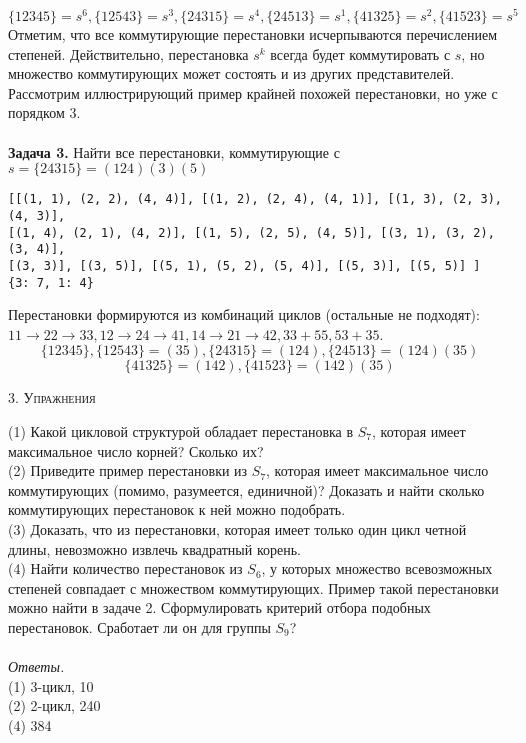 \documentclass[a4paper,12pt]{article}
\begin{document}
\[\{12345\} = s^6, \{12543\} = s^3, \{24315\} = s^4, \{24513\} = s^1, \{41325\} = s^2, \{41523\} = s^5\]
Отметим, что все коммутирующие перестановки исчерпываются перечислением степеней. Действительно, перестановка $s^k$ всегда будет коммутировать с $s$, но множество коммутирующих может состоять и из других представителей. Рассмотрим иллюстрирующий пример крайней похожей перестановки, но уже с порядком 3. \\
\\
\textbf{Задача 3.} Найти все перестановки, коммутирующие с $s = \{24315\} = (124)(3)(5)$
\begin{lstlisting}
[[(1, 1), (2, 2), (4, 4)], [(1, 2), (2, 4), (4, 1)], [(1, 3), (2, 3), (4, 3)],
[(1, 4), (2, 1), (4, 2)], [(1, 5), (2, 5), (4, 5)], [(3, 1), (3, 2), (3, 4)], 
[(3, 3)], [(3, 5)], [(5, 1), (5, 2), (5, 4)], [(5, 3)], [(5, 5)] ]
{3: 7, 1: 4}
\end{lstlisting}
Перестановки формируются из комбинаций циклов (остальные не подходят): $11 \rightarrow 22 \rightarrow 33, 12 \rightarrow 24 \rightarrow 41, 14 \rightarrow 21 \rightarrow 42, 33 + 55, 53 + 35$.
\[\{12345\}, \{12543\} = (35), \{24315\} = (124), \{24513\} = (124)(35) \]
\[\{41325\} = (142), \{41523\} = (142)(35) \]
\begin{center}
    \textsc{3. Упражнения}
\end{center}
(1) Какой цикловой структурой обладает перестановка в $S_7$, которая имеет максимальное число корней? Сколько их? \\ 
(2) Приведите пример перестановки из $S_7$, которая имеет максимальное число коммутирующих (помимо, разумеется, единичной)? Доказать и найти сколько коммутирующих перестановок к ней можно подобрать. \\
(3) Доказать, что из перестановки, которая имеет только один цикл четной длины, невозможно извлечь квадратный корень. \\
(4) Найти количество перестановок из $S_6$, у которых множество всевозможных степеней совпадает с множеством коммутирующих. Пример такой перестановки можно найти в задаче 2. Сформулировать критерий отбора подобных перестановок. Сработает ли он для группы $S_9$?
\\
\\
\textit{Ответы.} \\
(1) {\tiny 3-цикл, 10} \\
(2) {\tiny 2-цикл, 240} \\
(4) {\tiny 384}
\end{document}
